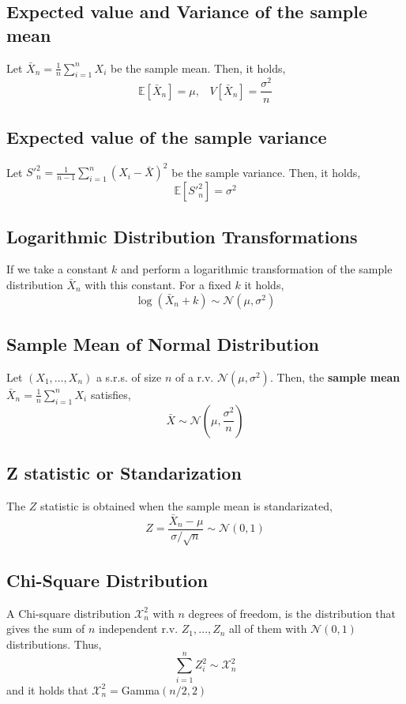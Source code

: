 \subsection{Expected value and Variance of the sample mean}
Let $\bar{X}_n = \frac{1}{n}\sum_{i=1}^n X_i$ be the sample mean. Then, it holds,
\[ \mathbb{E}[\bar{X}_n] = \mu,\;\;\; V[\bar{X}_n] = \frac{\sigma^2}{n} \]

\subsection{Expected value of the sample variance}
Let $S'^2_n = \frac{1}{n-1}\sum_{i=1}^{n} (X_i-\bar{X})^2 $ be the sample variance. Then, it holds,
\[ \mathbb{E}[S'^2_n] = \sigma^2 \]

\subsection{Logarithmic Distribution Transformations}
If we take a constant $k$ and perform a logarithmic transformation of the sample distribution $\bar{X}_n$ with this constant. For a fixed $k$ it holds,
\[ \log(\bar{X}_n + k) \sim \mathcal{N}(\mu, \sigma^2) \]

\subsection{Sample Mean of Normal Distribution}
Let $(X_1,\dots,X_n)$ a s.r.s. of size $n$ of a r.v. $\mathcal{N}(\mu,\sigma^2)$. Then, the \textbf{sample mean} $\bar{X}_n = \frac{1}{n}\sum_{i=1}^n X_i$
satisfies,
\[ \bar{X} \sim \mathcal{N}(\mu,\frac{\sigma^2}{n}) \]

\subsection{Z statistic or Standarization}
The $Z$ statistic is obtained when the sample mean is standarizated,
\[ Z = \frac{\bar{X}_n - \mu}{\sigma / \sqrt{n}} \sim \mathcal{N}(0,1) \]

\subsection{Chi-Square Distribution}
A Chi-square distribution $\mathcal{X}_n^2$ with $n$ degrees of freedom, is the distribution that gives the sum of $n$ independent r.v. $Z_1,\dots,Z_n$ all of
them with $\mathcal{N}(0,1)$ distributions. Thus,
\[ \sum_{i=1}^n Z_i^2 \sim \mathcal{X}_n^2 \]
and it holds that $\mathcal{X}^2_n = $Gamma$(n/2,2)$

